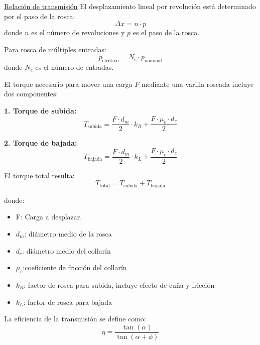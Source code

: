\underline{Relación de transmisión}
El desplazamiento lineal por revolución está determinado por el paso de la rosca:
\begin{equation}
    \Delta x = n \cdot p
\end{equation}
donde $n$ es el número de revoluciones y $p$ es el paso de la rosca.

Para rosca de múltiples entradas:
\begin{equation}
    p_{\text{efectivo}} = N_e \cdot p_{\text{nominal}}
\end{equation}
donde $N_e$ es el número de entradas.

El torque necesario para mover una carga $F$ mediante una varilla roscada incluye dos componentes:

\textbf{1. Torque de subida:}
\begin{equation}
T_{\text{subida}} = \frac{F \cdot d_m}{2} \cdot k_R + \frac{F \cdot \mu_c \cdot d_c}{2}
\label{eq:torque_subida}
\end{equation}

\textbf{2. Torque de bajada:}
\begin{equation}
T_{\text{bajada}} = \frac{F \cdot d_m}{2} \cdot k_L + \frac{F \cdot \mu_c \cdot d_c}{2}
\label{eq:torque_bajada}
\end{equation}

El torque total resulta:
\begin{equation}
    T_{\text{total}} = T_{\text{subida}} + T_{\text{bajada}} 
    \label{eq:torque_total_varilla}
\end{equation}

donde:
\begin{itemize}[label=$\bullet$]
    \item F: Carga a desplazar.
    \item $d_m$: diámetro medio de la rosca
    \item $d_c$: diámetro medio del collarín
    \item $\mu_c$:coeficiente de fricción del collarín
    \item $k_R$:  factor de rosca para subida, incluye efecto de cuña y fricción
    \item $k_L$: factor de rosca para bajada
\end{itemize}

La eficiencia de la transmisión se define como:
\begin{equation}
    \eta = \frac{\tan(\alpha)}{\tan(\alpha + \phi)}
\end{equation}

